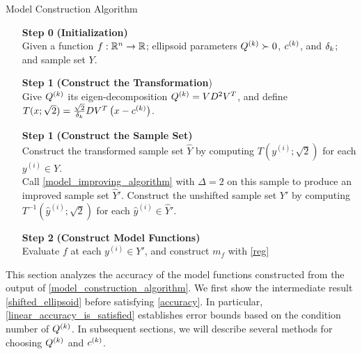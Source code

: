 {
\begin{fullwidth}[leftmargin=0in, rightmargin=0in, width=\linewidth-0.35in]
\begin{flushleft}

\begin{algorithm}[H]
    \caption{Model Construction Algorithm}
    \label{model_construction_algorithm}
    \begin{itemize}
        \item[\textbf{Step 0}] \textbf{(Initialization)} \\
			Given a function $f : \mathbb R^n \to \mathbb R$;
			ellipsoid parameters ${Q^{(k)}} \succ 0$, $c^{(k)}$, and $\delta_k$;
        	and sample set $Y$.
        \item[\textbf{Step 1}] \textbf{(Construct the Transformation}) \\
        	Give ${Q^{(k)}}$ its eigen-decomposition ${Q^{(k)}} = VD^2V^T$, and define
			$T(x; \sqrt{2}) = \frac{\sqrt{2}}{\delta_k} D V^T\left(x - c^{(k)}\right)$.
        \item[\textbf{Step 1}] \textbf{(Construct the Sample Set)} \\
        Construct the transformed sample set $\hat Y$ by computing $T\left(y^{(i)}; \sqrt{2}\right)$ for each $y^{(i)} \in Y$. \\
        Call \cref{model_improving_algorithm} with $\Delta = 2$ on this sample to produce an improved sample set $\hat Y '$.
        Construct the unshifted sample set $Y'$ by computing $T^{-1}\left(\hat y^{(i)}; \sqrt{2}\right)$ for each $\hat y^{(i)} \in \hat Y'$.
        \item[\textbf{Step 2}] \textbf{(Construct Model Functions)} \\
        Evaluate $f$ at each $y^{(i)} \in Y'$, and construct $m_f$ with \cref{reg}
    \end{itemize}
\end{algorithm}


\end{flushleft}
\end{fullwidth}
}

This section analyzes the accuracy of the model functions constructed from the output of \cref{model_construction_algorithm}.
We first show the intermediate result
\cref{shifted_ellipsoid}
before satisfying \cref{accuracy}.
In particular, \cref{linear_accuracy_is_satisfied} establishes error bounds based on the condition number of ${Q^{(k)}}$.
In subsequent sections, we will describe several methods for choosing ${Q^{(k)}}$ and $c^{(k)}$.

